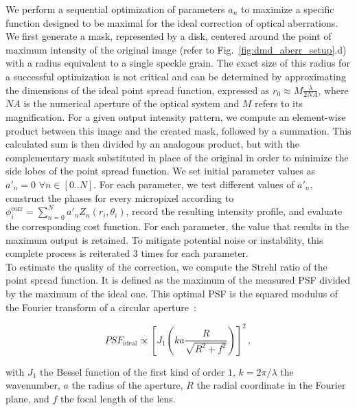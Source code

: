 \documentclass[12pt]{iopart}
\newcommand{\be}{\begin{equation}}
\newcommand{\ee}{\end{equation}}
\begin{document}
We perform a sequential optimization of parameters $a_n$
to maximize a specific function designed
to be maximal for the ideal correction of optical aberrations.
We first  generate a mask, represented by a disk,
centered around the point of maximum intensity of the original image (refer to Fig.~\ref{fig:dmd_aberr_setup}.d)
with a radius equivalent to a single speckle grain.
The exact size of this radius for a successful optimization is not critical
and can be determined by approximating the dimensions of the ideal point spread function,
expressed as $r_0 \approx M \frac{\lambda}{2 NA}$,
where $NA$ is the numerical aperture of the optical system and $M$ refers to its magnification.
For a given output intensity pattern, we compute an element-wise product between this image
and the created mask, followed by a summation.
This calculated sum is then divided by an analogous product, but with the complementary mask substituted in place of the original
in order to minimize the side lobes of the point spread function.
We set initial parameter values as $a'_n = 0\,\, \forall n \in [0..N]$.
For each parameter, we test different values of $a'_n$,
construct the phases for every micropixel according to
$\phi_i^\text{corr} = \sum_{n=0}^N a'_n Z_n(r_i,\theta_i)$,
record the resulting intensity profile,
and evaluate the corresponding cost function.
For each parameter, the value that results in the maximum output is retained.
To mitigate potential noise or instability, this complete process is reiterated $3$ times for each parameter.\\


To estimate the quality of the correction,
we compute the Strehl ratio of the point spread function.
It is defined as the maximum of the measured PSF divided
by the maximum of the ideal one.
This optimal PSF is
the  squared modulus of the Fourier transform of a circular aperture~\cite{airy1835diffraction}:

\be
PSF_\text{ideal} \propto
\left[
  J_1\left(k a \frac{R}{\sqrt{R^2+f^2}}\right)
  \right]^2 \, ,
\ee

with $J_1$ the Bessel function of the first kind of order $1$,
$k = 2\pi/\lambda$ the wavenumber,
$a$ the radius of the aperture,
$R$ the radial coordinate in the Fourier plane,
and $f$ the focal length of the lens.\\
\end{document}
